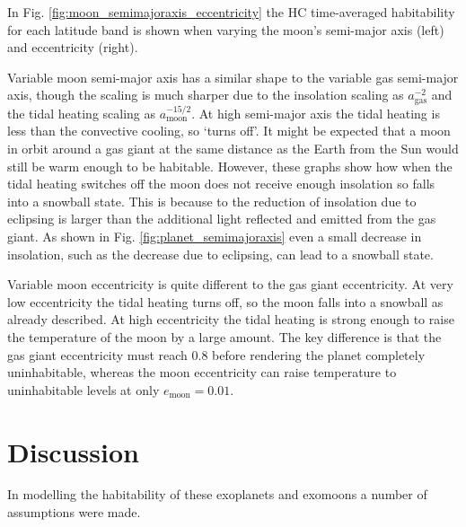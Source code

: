 \documentclass[12pt, onecolumn]{revtex4-2}    %
\begin{document}
In Fig. \ref{fig:moon_semimajoraxis_eccentricity} the HC time-averaged habitability for each latitude band is shown when varying the moon's semi-major axis (left) and eccentricity (right).

Variable moon semi-major axis has a similar shape to the variable gas semi-major axis, though the scaling is much sharper due to the insolation scaling as $a_\text{gas}^{-2}$ and the tidal heating scaling as $a_\text{moon}^{-15/2}$.
At high semi-major axis the tidal heating is less than the convective cooling, so `turns off'.
It might be expected that a moon in orbit around a gas giant at the same distance as the Earth from the Sun would still be warm enough to be habitable.
However, these graphs show how when the tidal heating switches off the moon does not receive enough insolation so falls into a snowball state.
This is because to the reduction of insolation due to eclipsing is larger than the additional light reflected and emitted from the gas giant.
As shown in Fig. \ref{fig:planet_semimajoraxis} even a small decrease in insolation, such as the decrease due to eclipsing, can lead to a snowball state.

Variable moon eccentricity is quite different to the gas giant eccentricity.
At very low eccentricity the tidal heating turns off, so the moon falls into a snowball as already described.
At high eccentricity the tidal heating is strong enough to raise the temperature of the moon by a large amount.
The key difference is that the gas giant eccentricity must reach $0.8$ before rendering the planet completely uninhabitable, whereas the moon eccentricity can raise temperature to uninhabitable levels at only $e_\text{moon} = 0.01$.

\section{Discussion} \label{sec:Discussion}
In modelling the habitability of these exoplanets and exomoons a number of assumptions were made.
\end{document}
